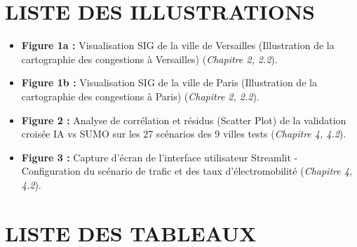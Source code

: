 \documentclass[10pt, a4paper]{article}
\providecommand{\tightlist}{}
\begin{document}
\newpage

\section{LISTE DES ILLUSTRATIONS}\label{liste-des-illustrations}

\begin{itemize}
\tightlist
\item
  \textbf{Figure 1a :} Visualisation SIG de la ville de Versailles
  (Illustration de la cartographie des congestions à Versailles)
  (\emph{Chapitre 2, 2.2}).
\item
  \textbf{Figure 1b :} Visualisation SIG de la ville de Paris
  (Illustration de la cartographie des congestions à Paris)
  (\emph{Chapitre 2, 2.2}).
\item
  \textbf{Figure 2 :} Analyse de corrélation et résidus (Scatter Plot)
  de la validation croisée IA vs SUMO sur les 27 scénarios des 9 villes
  tests (\emph{Chapitre 4, 4.2}).
\item
  \textbf{Figure 3 :} Capture d'écran de l'interface utilisateur
  Streamlit - Configuration du scénario de trafic et des taux
  d'électromobilité (\emph{Chapitre 4, 4.2}).
\end{itemize}

\newpage

\section{LISTE DES TABLEAUX}\label{liste-des-tableaux}
\end{document}
